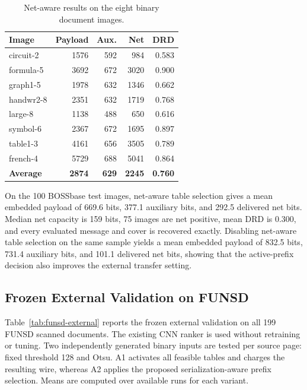 \documentclass[a4paper,fleqn]{cas-dc}
\newcommand{\RevisionAddBegin}{\begingroup}
\newcommand{\RevisionAddEnd}{\endgroup}
\newcommand{\RevisionAddBegin}{\begingroup\color{revisionblue}}
\newcommand{\RevisionAddEnd}{\endgroup}
\begin{document}
\begin{table}[t]
\centering
\caption{Net-aware results on the eight binary document images.}
\label{tab:document-net}
\begin{tabular}{@{}lrrrr@{}}
\toprule
\textbf{Image} & \textbf{Payload} & \textbf{Aux.} & \textbf{Net} & \textbf{DRD} \\
\midrule
circuit-2 & 1576 & 592 & 984 & 0.583 \\
formula-5 & 3692 & 672 & 3020 & 0.900 \\
graph1-5 & 1978 & 632 & 1346 & 0.662 \\
handwr2-8 & 2351 & 632 & 1719 & 0.768 \\
large-8 & 1138 & 488 & 650 & 0.616 \\
symbol-6 & 2367 & 672 & 1695 & 0.897 \\
table1-3 & 4161 & 656 & 3505 & 0.789 \\
french-4 & 5729 & 688 & 5041 & 0.864 \\
\midrule
\textbf{Average} & \textbf{2874} & \textbf{629} & \textbf{2245} & \textbf{0.760} \\
\bottomrule
\end{tabular}
\end{table}

\RevisionAddBegin
On the 100 BOSSbase test images, net-aware table selection gives a mean
embedded payload of 669.6 bits, 377.1 auxiliary bits, and 292.5 delivered net
bits. Median net capacity is 159 bits, 75 images are net positive, mean DRD is
0.300, and every evaluated message and cover is recovered exactly. Disabling
net-aware table selection on the same sample yields a mean embedded payload of
832.5 bits, 731.4 auxiliary bits, and 101.1 delivered net bits, showing that the
active-prefix decision also improves the external transfer setting.
\RevisionAddEnd

\RevisionAddBegin
\subsection{Frozen External Validation on FUNSD}
\label{subsec:funsd-external}

Table~\ref{tab:funsd-external} reports the frozen external validation on all
199 FUNSD scanned documents. The existing CNN ranker is used without retraining
or tuning. Two independently generated binary inputs are tested per source page:
fixed threshold 128 and Otsu. A1 activates all feasible tables and charges the
resulting wire, whereas A2 applies the proposed serialization-aware prefix
selection. Means are computed over available runs for each variant.
\RevisionAddEnd
\end{document}
